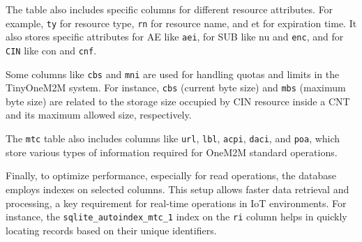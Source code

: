 \documentclass[a4paper,fleqn]{cas-dc}
\begin{document}
The table also includes specific columns for different resource attributes. For example, \texttt{ty} for resource type, \texttt{rn} for resource name, and et for expiration time. It also stores specific attributes for AE like \texttt{aei}, for SUB like nu and \texttt{enc}, and for \texttt{CIN} like con and \texttt{cnf}.

Some columns like \texttt{cbs} and \texttt{mni} are used for handling quotas and limits in the TinyOneM2M system. For instance, \texttt{cbs} (current byte size) and \texttt{mbs} (maximum byte size) are related to the storage size occupied by CIN resource inside a CNT and its maximum allowed size, respectively.

The \texttt{mtc} table also includes columns like \texttt{url}, \texttt{lbl}, \texttt{acpi}, \texttt{daci}, and \texttt{poa}, which store various types of information required for OneM2M standard operations.

Finally, to optimize performance, especially for read operations, the database employs indexes on selected columns. This setup allows faster data retrieval and processing, a key requirement for real-time operations in IoT environments. For instance, the \texttt{sqlite\_autoindex\_mtc\_1} index on the \texttt{ri} column helps in quickly locating records based on their unique identifiers.
\end{document}
